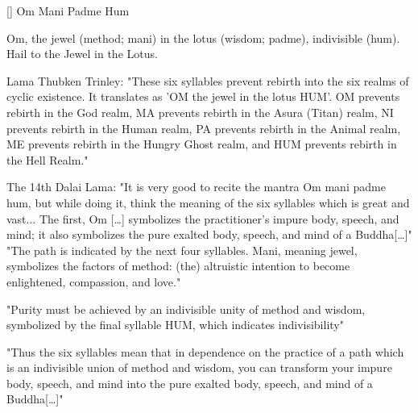 []
  \beginverse
    Om Mani Padme Hum
  \endverse
  \begin{feeler}
    Om, the jewel (method; mani) in the lotus (wisdom; padme), indivisible (hum). 
    Hail to the Jewel in the Lotus.
  \end{feeler}
  \begin{explanation}
    Lama Thubken Trinley: "These six syllables prevent rebirth into the six realms of cyclic 
    existence. It translates as 'OM the jewel in the lotus HUM'. OM prevents rebirth in the God 
    realm, MA prevents rebirth in the Asura (Titan) realm, NI prevents rebirth in the Human realm, 
    PA prevents rebirth in the Animal realm, ME prevents rebirth in the Hungry Ghost realm, and 
    HUM prevents rebirth in the Hell Realm."

    The 14th Dalai Lama: "It is very good to recite the mantra Om mani padme hum, but while doing 
    it, think the meaning of the six syllables which is great and vast... The first, Om [\ldots ] 
    symbolizes the practitioner's impure body, speech, and mind; it also symbolizes the pure 
    exalted body, speech, and mind of a Buddha[\ldots ]" "The path is indicated by the next four 
    syllables. Mani, meaning jewel, symbolizes the factors of method: (the) altruistic intention 
    to become enlightened, compassion, and love." 

    "Purity must be achieved by an indivisible unity of method and wisdom, symbolized by the final 
    syllable HUM, which indicates indivisibility" 

    "Thus the six syllables mean that in dependence on the practice of a path which is an 
    indivisible union of method and wisdom, you can transform your impure body, speech, and mind 
    into the pure exalted body, speech, and mind of a Buddha[\ldots ]"
  \end{explanation}
\endsong


